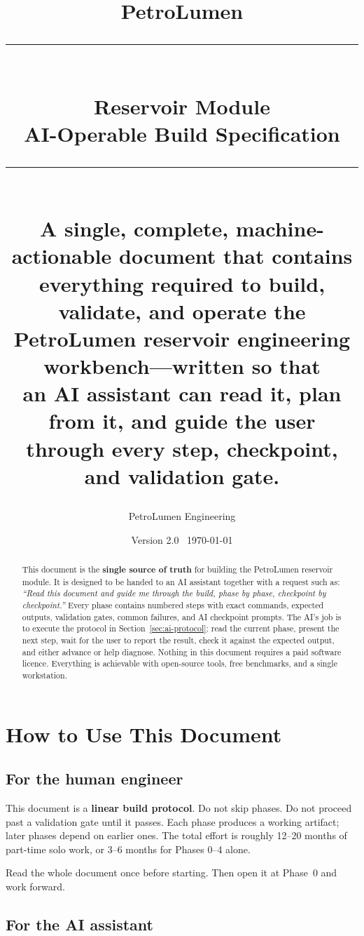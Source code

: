 \documentclass[10pt,a4paper]{article}
\title{
  \vspace{-1.2cm}
  \textbf{PetroLumen}\\[0.2em]
  \rule{\linewidth}{1pt}\\[0.3em]
  \Large Reservoir Module\\[0.2em]
  \large AI-Operable Build Specification\\[0.4em]
  \rule{\linewidth}{1pt}\\[0.6em]
  \normalsize
  A single, complete, machine-actionable document that contains\\[0.2em]
  \textbf{everything} required to build, validate, and operate the\\[0.2em]
  PetroLumen reservoir engineering workbench---written so that\\[0.2em]
  an AI assistant can read it, plan from it, and guide the user\\
  through every step, checkpoint, and validation gate.
}
\author{PetroLumen Engineering}
\date{Version 2.0 \textperiodcentered\ \today}
\begin{document}
\maketitle
\thispagestyle{empty}

\begin{abstract}
\noindent
This document is the \textbf{single source of truth} for building the
PetroLumen reservoir module. It is designed to be handed to an AI assistant
together with a request such as: \emph{``Read this document and guide me
through the build, phase by phase, checkpoint by checkpoint.''} Every phase
contains numbered steps with exact commands, expected outputs, validation
gates, common failures, and AI checkpoint prompts. The AI's job is to execute
the protocol in Section~\ref{sec:ai-protocol}: read the current phase, present
the next step, wait for the user to report the result, check it against the
expected output, and either advance or help diagnose. Nothing in this document
requires a paid software licence. Everything is achievable with open-source
tools, free benchmarks, and a single workstation.
\end{abstract}

\tableofcontents
\clearpage

\section{How to Use This Document}
\label{sec:howto}

\subsection{For the human engineer}

This document is a \textbf{linear build protocol}. Do not skip phases. Do not
proceed past a validation gate until it passes. Each phase produces a working
artifact; later phases depend on earlier ones. The total effort is roughly
12--20 months of part-time solo work, or 3--6 months for Phases 0--4 alone.

Read the whole document once before starting. Then open it at Phase~0 and work
forward.

\subsection{For the AI assistant}
\end{document}
